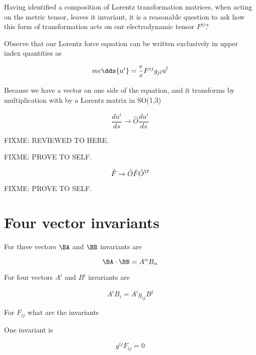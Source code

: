 Having identified a composition of Lorentz transformation matrices, when acting on the metric tensor, leaves it invariant, it is a reasonable question to ask how this form of transformation acts on our electrodynamic tensor $F^{ij}$?

Observe that our Lorentz force equation can be written exclusively in upper index quantities as

\begin{equation}\label{eqn:relativisticElectrodynamicsL11:370}
m c \dds{u^i} = \frac{e}{c} F^{ij} g_{jl} u^l
\end{equation}

Because we have a vector on one side of the equation, and it transforms by multiplication with by a Lorentz matrix in SO(1,3)

\begin{equation}\label{eqn:relativisticElectrodynamicsL11:390}
\frac{du^i}{ds} \rightarrow \hat{O} \frac{du^i}{ds} 
\end{equation}


FIXME: REVIEWED TO HERE.

FIXME: PROVE TO SELF.

\begin{equation}\label{eqn:relativisticElectrodynamicsL11:490}
\hat{F} \rightarrow \hat{O} \hat{F} \hat{O}^\T 
\end{equation}

FIXME: PROVE TO SELF.

\section{Four vector invariants}

For three vectors $\BA$ and $\BB$ invariants are

\begin{equation}\label{eqn:relativisticElectrodynamicsL11:510}
\BA \cdot \BB = A^\alpha B_\alpha
\end{equation}

For four vectors $A^i$ and $B^i$ invariants are

\begin{equation}\label{eqn:relativisticElectrodynamicsL11:530}
A^i B_i = A^i g_{ij} B^j  
\end{equation}

For $F_{ij}$ what are the invariants

One invariant is

\begin{equation}\label{eqn:relativisticElectrodynamicsL11:550}
g^{ij} F_{ij} = 0
\end{equation}

